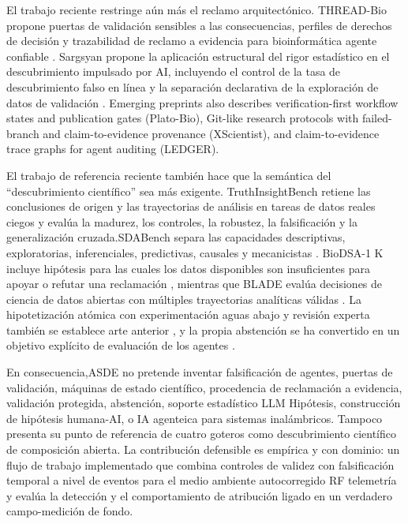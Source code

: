 \documentclass{ieeeaccess}
\begin{document}
El trabajo reciente restringe aún más el reclamo arquitectónico. THREAD-Bio propone puertas de validación sensibles a las consecuencias, perfiles de derechos de decisión y trazabilidad de reclamo a evidencia para bioinformática agente confiable \cite{THREAD-BIO-2026}. Sargsyan propone la aplicación estructural del rigor estadístico en el descubrimiento impulsado por AI, incluyendo el control de la tasa de descubrimiento falso en línea y la separación declarativa de la exploración de datos de validación \cite{SARGSYAN-RIGOR-2025}. Emerging preprints also describes verification-first workflow states and publication gates (Plato-Bio), Git-like research protocols with failed-branch and claim-to-evidence provenance (XScientist), and claim-to-evidence trace graphs for agent auditing (LEDGER)\cite{PLATO-BIO-2026,XSCIENTIST-2026,LEDGER-2026}.

El trabajo de referencia reciente también hace que la semántica del ``descubrimiento científico'' sea más exigente. TruthInsightBench retiene las conclusiones de origen y las trayectorias de análisis en tareas de datos reales ciegos y evalúa la madurez, los controles, la robustez, la falsificación y la generalización cruzada.\cite{TRUTHINSIGHT-2026}SDABench separa las capacidades descriptivas, exploratorias, inferenciales, predictivas, causales y mecanicistas \cite{SDABENCH-2026}. BioDSA-1 K incluye hipótesis para las cuales los datos disponibles son insuficientes para apoyar o refutar una reclamación \cite{BIODSA-2025}, mientras que BLADE evalúa decisiones de ciencia de datos abiertas con múltiples trayectorias analíticas válidas \cite{BLADE-2024}. La hipotetización atómica con experimentación aguas abajo y revisión experta también se establece arte anterior \cite{EXPERIGEN-2026}, y la propia abstención se ha convertido en un objetivo explícito de evaluación de los agentes \cite{ABSTENTION-2026}.

En consecuencia,ASDE no pretende inventar falsificación de agentes, puertas de validación, máquinas de estado científico, procedencia de reclamación a evidencia, validación protegida, abstención, soporte estadístico LLM Hipótesis, construcción de hipótesis humana-AI, o IA agenteica para sistemas inalámbricos. Tampoco presenta su punto de referencia de cuatro goteros como descubrimiento científico de composición abierta. La contribución defensible es empírica y con dominio: un flujo de trabajo implementado que combina controles de validez con falsificación temporal a nivel de eventos para el medio ambiente autocorregido RF telemetría y evalúa la detección y el comportamiento de atribución ligado en un verdadero campo-medición de fondo.
\end{document}
